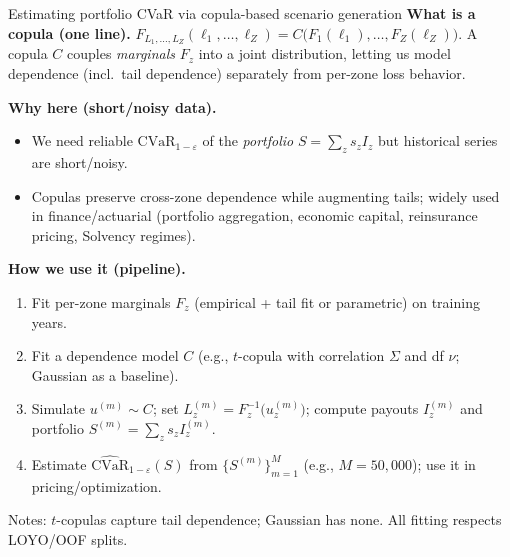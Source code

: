 \documentclass{beamer}
\begin{document}
\begin{frame}{Estimating portfolio CVaR via copula-based scenario generation}
  \small
  \textbf{What is a copula (one line).} \(
  F_{L_1,\dots,L_Z}(\ell_1,\dots,\ell_Z)
  = C\!\big(F_1(\ell_1),\dots,F_Z(\ell_Z)\big)
  \).
  A copula \(C\) couples \emph{marginals} \(F_z\) into a joint distribution, letting us model
  dependence (incl.\ tail dependence) separately from per-zone loss behavior.
  
  \medskip
  \textbf{Why here (short/noisy data).}
  \begin{itemize}\itemsep2pt
    \item We need reliable \(\mathrm{CVaR}_{1-\varepsilon}\) of the \emph{portfolio} \(S=\sum_z s_z I_z\) but historical series are short/noisy.
    \item Copulas preserve cross-zone dependence while augmenting tails; widely used in finance/actuarial
    (portfolio aggregation, economic capital, reinsurance pricing, Solvency regimes).
  \end{itemize}
  
  \medskip
  \textbf{How we use it (pipeline).}
  \begin{enumerate}\itemsep2pt
    \item Fit per-zone marginals \(F_z\) (empirical + tail fit or parametric) on training years.
    \item Fit a dependence model \(C\) (e.g., \(t\)-copula with correlation \(\Sigma\) and df \(\nu\); Gaussian as a baseline).
    \item Simulate \(u^{(m)}\sim C\); set \(L_z^{(m)} = F_z^{-1}\!\big(u^{(m)}_z\big)\); compute payouts \(I_z^{(m)}\) and portfolio \(S^{(m)}=\sum_z s_z I_z^{(m)}\).
    \item Estimate \(\widehat{\mathrm{CVaR}}_{1-\varepsilon}(S)\) from \(\{S^{(m)}\}_{m=1}^M\) (e.g., \(M=50{,}000\)); use it in pricing/optimization.
  \end{enumerate}
  
  \medskip
  {\scriptsize Notes: \(t\)-copulas capture tail dependence; Gaussian has none. All fitting respects LOYO/OOF splits.}
  \end{frame}
\end{document}
